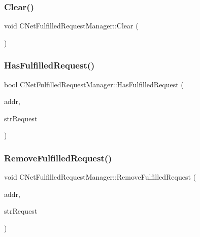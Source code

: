 \subsubsection{\texorpdfstring{Clear()}{Clear()}}
{\footnotesize\ttfamily void C\+Net\+Fulfilled\+Request\+Manager\+::\+Clear (\begin{DoxyParamCaption}{ }\end{DoxyParamCaption})}

\mbox{\label{class_c_net_fulfilled_request_manager_a1e4b7cdeb0f4fae6113c6714cf3b54bf}} 
\subsubsection{\texorpdfstring{Has\+Fulfilled\+Request()}{HasFulfilledRequest()}}
{\footnotesize\ttfamily bool C\+Net\+Fulfilled\+Request\+Manager\+::\+Has\+Fulfilled\+Request (\begin{DoxyParamCaption}\item[{\mbox{\hyperlink{class_c_address}{C\+Address}}}]{addr,  }\item[{std\+::string}]{str\+Request }\end{DoxyParamCaption})}

\mbox{\label{class_c_net_fulfilled_request_manager_a3f4fdff1f1d5df96c13769d5e4bd9fe1}} 
\subsubsection{\texorpdfstring{Remove\+Fulfilled\+Request()}{RemoveFulfilledRequest()}}
{\footnotesize\ttfamily void C\+Net\+Fulfilled\+Request\+Manager\+::\+Remove\+Fulfilled\+Request (\begin{DoxyParamCaption}\item[{\mbox{\hyperlink{class_c_address}{C\+Address}}}]{addr,  }\item[{std\+::string}]{str\+Request }\end{DoxyParamCaption})}


